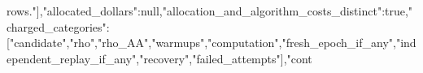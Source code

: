 \documentclass[10pt]{article}
\begin{document}
\allowbreak{}r\allowbreak{}o\allowbreak{}w\allowbreak{}s\allowbreak{}.\allowbreak{}"\allowbreak{}]\allowbreak{},\allowbreak{}"\allowbreak{}a\allowbreak{}l\allowbreak{}l\allowbreak{}o\allowbreak{}c\allowbreak{}a\allowbreak{}t\allowbreak{}e\allowbreak{}d\allowbreak{}\_\allowbreak{}d\allowbreak{}o\allowbreak{}l\allowbreak{}l\allowbreak{}a\allowbreak{}r\allowbreak{}s\allowbreak{}"\allowbreak{}:\allowbreak{}n\allowbreak{}u\allowbreak{}l\allowbreak{}l\allowbreak{},\allowbreak{}"\allowbreak{}a\allowbreak{}l\allowbreak{}l\allowbreak{}o\allowbreak{}c\allowbreak{}a\allowbreak{}t\allowbreak{}i\allowbreak{}o\allowbreak{}n\allowbreak{}\_\allowbreak{}a\allowbreak{}n\allowbreak{}d\allowbreak{}\_\allowbreak{}a\allowbreak{}l\allowbreak{}g\allowbreak{}o\allowbreak{}r\allowbreak{}i\allowbreak{}t\allowbreak{}h\allowbreak{}m\allowbreak{}\_\allowbreak{}c\allowbreak{}o\allowbreak{}s\allowbreak{}t\allowbreak{}s\allowbreak{}\_\allowbreak{}d\allowbreak{}i\allowbreak{}s\allowbreak{}t\allowbreak{}i\allowbreak{}n\allowbreak{}c\allowbreak{}t\allowbreak{}"\allowbreak{}:\allowbreak{}t\allowbreak{}r\allowbreak{}u\allowbreak{}e\allowbreak{},\allowbreak{}"\allowbreak{}c\allowbreak{}h\allowbreak{}a\allowbreak{}r\allowbreak{}g\allowbreak{}e\allowbreak{}d\allowbreak{}\_\allowbreak{}c\allowbreak{}a\allowbreak{}t\allowbreak{}e\allowbreak{}g\allowbreak{}o\allowbreak{}r\allowbreak{}i\allowbreak{}e\allowbreak{}s\allowbreak{}"\allowbreak{}:\allowbreak{}[\allowbreak{}"\allowbreak{}c\allowbreak{}a\allowbreak{}n\allowbreak{}d\allowbreak{}i\allowbreak{}d\allowbreak{}a\allowbreak{}t\allowbreak{}e\allowbreak{}"\allowbreak{},\allowbreak{}"\allowbreak{}r\allowbreak{}h\allowbreak{}o\allowbreak{}"\allowbreak{},\allowbreak{}"\allowbreak{}r\allowbreak{}h\allowbreak{}o\allowbreak{}\_\allowbreak{}A\allowbreak{}A\allowbreak{}"\allowbreak{},\allowbreak{}"\allowbreak{}w\allowbreak{}a\allowbreak{}r\allowbreak{}m\allowbreak{}u\allowbreak{}p\allowbreak{}s\allowbreak{}"\allowbreak{},\allowbreak{}"\allowbreak{}c\allowbreak{}o\allowbreak{}m\allowbreak{}p\allowbreak{}u\allowbreak{}t\allowbreak{}a\allowbreak{}t\allowbreak{}i\allowbreak{}o\allowbreak{}n\allowbreak{}"\allowbreak{},\allowbreak{}"\allowbreak{}f\allowbreak{}r\allowbreak{}e\allowbreak{}s\allowbreak{}h\allowbreak{}\_\allowbreak{}e\allowbreak{}p\allowbreak{}o\allowbreak{}c\allowbreak{}h\allowbreak{}\_\allowbreak{}i\allowbreak{}f\allowbreak{}\_\allowbreak{}a\allowbreak{}n\allowbreak{}y\allowbreak{}"\allowbreak{},\allowbreak{}"\allowbreak{}i\allowbreak{}n\allowbreak{}d\allowbreak{}e\allowbreak{}p\allowbreak{}e\allowbreak{}n\allowbreak{}d\allowbreak{}e\allowbreak{}n\allowbreak{}t\allowbreak{}\_\allowbreak{}r\allowbreak{}e\allowbreak{}p\allowbreak{}l\allowbreak{}a\allowbreak{}y\allowbreak{}\_\allowbreak{}i\allowbreak{}f\allowbreak{}\_\allowbreak{}a\allowbreak{}n\allowbreak{}y\allowbreak{}"\allowbreak{},\allowbreak{}"\allowbreak{}r\allowbreak{}e\allowbreak{}c\allowbreak{}o\allowbreak{}v\allowbreak{}e\allowbreak{}r\allowbreak{}y\allowbreak{}"\allowbreak{},\allowbreak{}"\allowbreak{}f\allowbreak{}a\allowbreak{}i\allowbreak{}l\allowbreak{}e\allowbreak{}d\allowbreak{}\_\allowbreak{}a\allowbreak{}t\allowbreak{}t\allowbreak{}e\allowbreak{}m\allowbreak{}p\allowbreak{}t\allowbreak{}s\allowbreak{}"\allowbreak{}]\allowbreak{},\allowbreak{}"\allowbreak{}c\allowbreak{}o\allowbreak{}n\allowbreak{}t\all
\end{document}
